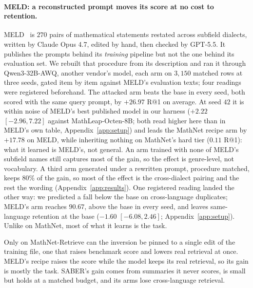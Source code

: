 \paragraph{MELD: a reconstructed prompt moves its score at no cost to retention.}
MELD~\citep{ye2026meld} is $270$ pairs of mathematical statements restated across subfield dialects, written by Claude Opus 4.7, edited by hand, then checked by GPT-5.5. It publishes the prompts behind its \emph{training} pipeline but not the one behind its evaluation set. We rebuilt that procedure from its description and ran it through Qwen3-32B-AWQ, another vendor's model, each arm on $3{,}150$ matched rows at three seeds, gated item by item against MELD's evaluation texts; four readings were registered beforehand. The attacked arm beats the base in every seed, both scored with the same query prompt, by $+26.97$ R@1 on average. At seed $42$ it is within noise of MELD's best published model in our harness ($+2.22$ $[-2.96, 7.22]$ against MathLeap-Octen-8B; both read higher here than in MELD's own table, Appendix~\ref{app:setup}) and leads the MathNet recipe arm by $+17.78$ on MELD, while inheriting nothing on MathNet's hard tier ($0.11$ R@1): what it learned is MELD's, not general. An arm trained with none of MELD's subfield names still captures most of the gain, so the effect is genre-level, not vocabulary. A third arm generated under a rewritten prompt, procedure matched, keeps $80\%$ of the gain, so most of the effect is the cross-dialect pairing and the rest the wording (Appendix~\ref{app:results}). One registered reading landed the other way: we predicted a fall below the base on cross-language duplicates; MELD's arm reaches $90.67$, above the base in every seed, and leaves same-language retention at the base ($-1.60$ $[-6.08, 2.46]$; Appendix~\ref{app:setup}). Unlike on MathNet, most of what it learns is the task.

Only on MathNet-Retrieve can the inversion be pinned to a single edit of the training file, one that raises benchmark score and lowers real retrieval at once. MELD's recipe raises the score while the model keeps its real retrieval, so its gain is mostly the task. SABER's gain comes from summaries it never scores, is small but holds at a matched budget, and its arms lose cross-language retrieval.